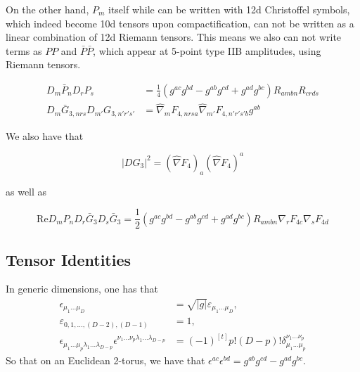 On the other hand, $P_m$ itself while can be written with 12d Christoffel symbols, which indeed become 10d tensors upon compactification, can not be written as a linear combination of 12d Riemann tensors.
This means we also can not write terms as $PP$ and $\bar{P}\bar{P}$, which appear at 5-point type IIB amplitudes, using Riemann tensors.

\begin{equation}
\begin{aligned}
D_m\bar{P}_n D_r P_s &= \frac{1}{4}(g^{ac}g^{bd} - g^{ab}g^{cd}+g^{ad}g^{bc})R_{ambn}R_{crds}\\
D_m \bar{G}_{3,nrs} D_{m'} G_{3,n'r's'}
&= \hat{\nabla}_m F_{4,nrs a} \hat{\nabla}_{m'} F_{4,n'r's' b} g^{ab}\end{aligned}
\end{equation}

We also have that 

$$|DG_3|^2 = (\hat{\nabla} F_4)_a (\hat{\nabla} F_4)^a$$

as well as

\begin{equation}
\text{Re} D_m P_n D_r \bar{G}_3 D_s \bar{G}_3 = \frac{1}{2} (g^{ac} g^{bd} - g^{ab}g^{cd} + g^{ad}g^{bc}) R_{ambn} \nabla_r F_{4c} \nabla_s F_{4d}
\end{equation}


\subsection{Tensor Identities}
In generic dimensions, one has that
\begin{equation}
\begin{aligned}
\epsilon_{\mu_1...\mu_D} 
&= \sqrt{|g|}\varepsilon_{\mu_1...\mu_D},\\
\varepsilon_{0,1,...,(D-2),(D-1)} 
&= 1,\\
\epsilon_{\mu_1...\mu_p \lambda_1 ...\lambda_{D-p}}
\epsilon^{\nu_1...\nu_p \lambda_1 ...\lambda_{D-p}}
&=(-1)^{[t]} p!(D-p)!\delta^{\nu_1...\nu_p}_{\mu_1...\mu_p}
\end{aligned}
\end{equation}
So that on an Euclidean 2-torus, we have that $\epsilon^{ac}\epsilon^{bd} = g^{ab}g^{cd} - g^{ad}g^{bc}$.

